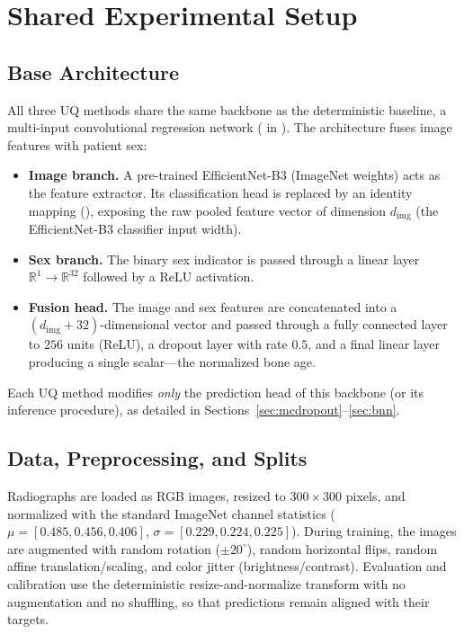 \section{Shared Experimental Setup}
\label{sec:setup}

\subsection{Base Architecture}

All three UQ methods share the same backbone as the deterministic baseline, a
multi-input convolutional regression network ( in
). The architecture fuses image features with patient sex:

\begin{itemize}
  \item \textbf{Image branch.} A pre-trained EfficientNet-B3 (ImageNet
   weights) acts as the feature extractor. Its
  classification head is replaced by an identity mapping
  (), exposing the raw pooled feature vector of dimension
  $d_\text{img}$ (the EfficientNet-B3 classifier input width).
  \item \textbf{Sex branch.} The binary sex indicator is passed through a linear
  layer $\mathbb{R}^{1}\!\to\!\mathbb{R}^{32}$ followed by a ReLU activation.
  \item \textbf{Fusion head.} The image and sex features are concatenated into a
  $(d_\text{img}+32)$-dimensional vector and passed through a fully connected
  layer to $256$ units (ReLU), a dropout layer with rate $0.5$, and a final
  linear layer producing a single scalar---the normalized bone age.
\end{itemize}

Each UQ method modifies \emph{only} the prediction head of this backbone (or its
inference procedure), as detailed in Sections~\ref{sec:mcdropout}--\ref{sec:bnn}.

\subsection{Data, Preprocessing, and Splits}

Radiographs are loaded as RGB images, resized to $300\times300$ pixels, and
normalized with the standard ImageNet channel statistics
($\mu=[0.485, 0.456, 0.406]$, $\sigma=[0.229, 0.224, 0.225]$). During training,
the images are augmented with random rotation ($\pm20^\circ$), random horizontal
flips, random affine translation/scaling, and color jitter
(brightness/contrast). Evaluation and calibration use the deterministic
resize-and-normalize transform with no augmentation and no shuffling, so that
predictions remain aligned with their targets.

